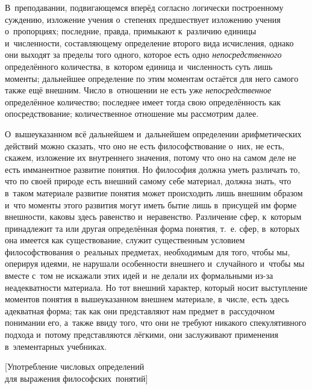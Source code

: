 В~преподавании, подвигающемся вперёд согласно логически построенному суждению,
изложение учения о~степенях предшествует изложению учения о~пропорциях;
последние, правда, примыкают к~различию единицы и~численности, составляющему
определение второго вида исчисления, однако они выходят за пределы того одного,
которое есть одно {\em непосредственного} определённого количества, в~котором
единица и~численность суть лишь моменты; дальнейшее определение по этим
моментам остаётся для него самого также ещё внешним. Число в~отношении не
есть уже {\em непосредственное} определённое количество; последнее имеет тогда
свою определённость как опосредствование; количественное отношение мы
рассмотрим далее.

О~вышеуказанном всё дальнейшем и~дальнейшем определении арифметических действий
можно сказать, что оно не есть философствование о~них, не есть, скажем,
изложение их внутреннего значения, потому что оно на самом деле не есть
имманентное развитие понятия. Но философия должна уметь различать то, что по
своей природе есть внешний самому себе материал, должна знать, что в~таком
материале развитие понятия может происходить лишь внешним
образом и~что моменты этого развития могут иметь бытие лишь в~присущей
им форме внешности, каковы здесь равенство и~неравенство. Различение
сфер, к~которым принадлежит та или другая определённая форма понятия, т.~е.
сфер, в~которых она имеется как существование, служит существенным условием
философствования о~реальных предметах, необходимым для того, чтобы мы, оперируя идеями, не
нарушали особенности внешнего и~случайного и~чтобы мы вместе с~том не искажали
этих идей и~не делали их формальными из-за неадекватности материала.
Но тот внешний характер, который носит выступление моментов понятия в
вышеуказанном внешнем материале, в~числе, есть здесь адекватная форма; так
как они представляют нам предмет в~рассудочном понимании его, а~также ввиду того, что
они не требуют никакого спекулятивного подхода и~потому представляются лёгкими,
они заслуживают применения в~элементарных учебниках.

%
{[Употребление числовых определений\\ для выражения философских~понятий]}

